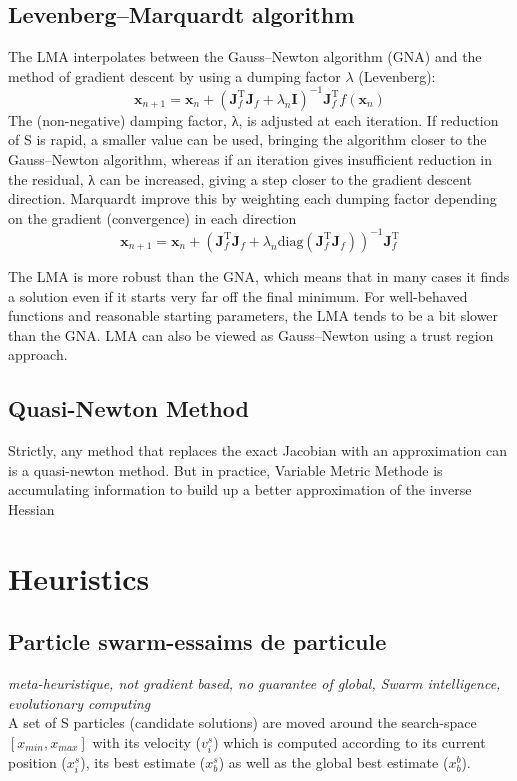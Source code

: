 \documentclass[twocolumn]{article}
\numberwithin{equation}{section}
\begin{document}
	\subsection{Levenberg–Marquardt algorithm}
The LMA interpolates between the Gauss–Newton algorithm (GNA) and the method of gradient descent by using a dumping factor $\lambda$ (Levenberg):
$$ \mathbf{x}_{n+1} = \mathbf{x}_n  +  (\mathbf{J}_f^\mathrm{T}\mathbf{J}_f + \lambda_n \mathbf{I})^{-1}\mathbf{J}_f^\mathrm{T} f(\mathbf{x}_n)$$
The (non-negative) damping factor, λ, is adjusted at each iteration. If reduction of S is rapid, a smaller value can be used, bringing the algorithm closer to the Gauss–Newton algorithm, whereas if an iteration gives insufficient reduction in the residual, λ can be increased, giving a step closer to the gradient descent direction.
Marquardt improve this by weighting each dumping factor depending on the gradient (convergence) in each direction
$$ \mathbf{x}_{n+1} = \mathbf{x}_n  +  (\mathbf{J}_f^\mathrm{T}\mathbf{J}_f + \lambda_n \mathrm{diag}(\mathbf{J}_f^\mathrm{T}\mathbf{J}_f) )^{-1}\mathbf{J}_f^\mathrm{T}$$

The LMA is more robust than the GNA, which means that in many cases it finds a solution even if it starts very far off the final minimum. For well-behaved functions and reasonable starting parameters, the LMA tends to be a bit slower than the GNA. LMA can also be viewed as Gauss–Newton using a trust region approach.

	\subsection{Quasi-Newton Method} 
Strictly, any method that replaces the exact Jacobian with an approximation can is a quasi-newton method. But in practice, Variable Metric Methode is accumulating information to build up a better approximation of the inverse Hessian 

\section{Heuristics}


	\subsection{Particle swarm-essaims de particule}
\emph{meta-heuristique, not gradient based, no guarantee of global, Swarm intelligence, evolutionary computing}\\
A set of S particles (candidate solutions) are moved around the search-space $[x_{min}, x_{max}]$ with its velocity ($v_i^s$) which is computed according to its current position ($x_i^s$), its best estimate ($x_b^s$) as well as the global best estimate ($x_b^b$).
\end{document}
